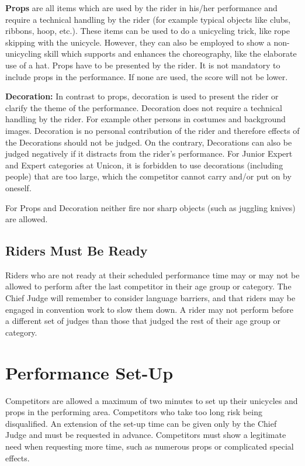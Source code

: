 \textbf{Props} are all items which are used by the rider in his/her performance and require a technical handling by the rider (for example typical objects like clubs, ribbons, hoop, etc.).
These items can be used to do a unicycling trick, like rope skipping with the unicycle.
However, they can also be employed to show a non-unicycling skill which supports and enhances the choreography, like the elaborate use of a hat.
Props have to be presented by the rider.
It is not mandatory to include props in the performance.
If none are used, the score will not be lower.

\textbf{Decoration:} In contrast to props, decoration is used to present the rider or clarify the theme of the performance.
Decoration does not require a technical handling by the rider.
For example other persons in costumes and background images.
Decoration is no personal contribution of the rider and therefore effects of the Decorations should not be judged.
On the contrary, Decorations can also be judged negatively if it distracts from the rider's performance.
For Junior Expert and Expert categories at Unicon, it is forbidden to use decorations (including people) that are too large, which the competitor cannot carry and/or put on by oneself.

For Props and Decoration neither fire nor sharp objects (such as juggling knives) are allowed.

\subsection{Riders Must Be Ready}
Riders who are not ready at their scheduled performance time may or may not be allowed to perform after the last competitor in their age group or category.
The Chief Judge will remember to consider language barriers, and that riders may be engaged in convention work to slow them down.
A rider may not perform before a different set of judges than those that judged the rest of their age group or category.

\section{Performance Set-Up}
Competitors are allowed a maximum of two minutes to set up their unicycles and props in the performing area.
Competitors who take too long risk being disqualified.
An extension of the set-up time can be given only by the Chief Judge and must be requested in advance.
Competitors must show a legitimate need when requesting more time, such as numerous props or complicated special effects.

